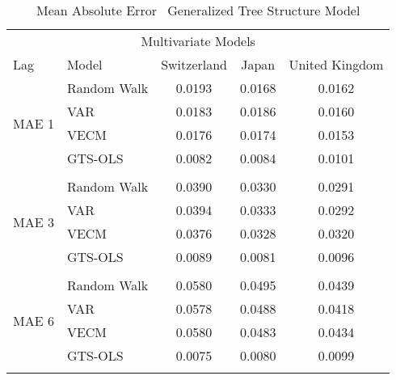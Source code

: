 \begin{table}[!h] %
  \centering
    \caption[MAE \textendash \ GTS Model]{Mean Absolute Error \textendash \ Generalized Tree Structure Model}
  \begin{tabular}{llccc} %
    \toprule
    \multicolumn{5}{c}{Multivariate Models}                      \\
    \cmidrule(r){1-5}
    Lag                           &   Model                                     &Switzerland  & Japan     & United Kingdom\\
    \midrule
    \multirow{4}{*}{MAE 1}        & \multicolumn{1}{l}{Random Walk}             &   0.0193  & 0.0168  & 0.0162 \\  
                                  & \multicolumn{1}{l}{VAR}                     &   0.0183  & 0.0186  & 0.0160 \\ 
                                  & \multicolumn{1}{l}{VECM}                    &   0.0176  & 0.0174  & 0.0153 \\
                                  & \multicolumn{1}{l}{GTS-OLS}                 &   0.0082  & 0.0084  & 0.0101 \\    
    \\
    \multirow{4}{*}{MAE 3}        & \multicolumn{1}{l}{Random Walk}             &   0.0390  & 0.0330  & 0.0291 \\ 
                                  & \multicolumn{1}{l}{VAR}                     &   0.0394  & 0.0333  & 0.0292 \\
                                  & \multicolumn{1}{l}{VECM}                    &   0.0376  & 0.0328  & 0.0320 \\
                                  & \multicolumn{1}{l}{GTS-OLS}                 &   0.0089  & 0.0081  & 0.0096 \\
    \\
    \multirow{4}{*}{MAE 6}        & \multicolumn{1}{l}{Random Walk}             &   0.0580  & 0.0495  & 0.0439 \\
                                  & \multicolumn{1}{l}{VAR}                     &   0.0578  & 0.0488  & 0.0418 \\
                                  & \multicolumn{1}{l}{VECM}                    &   0.0580  & 0.0483  & 0.0434 \\
                                  & \multicolumn{1}{l}{GTS-OLS}                 &   0.0075  & 0.0080  & 0.0099 \\    
     \\

\end{tabular}
\end{table}
